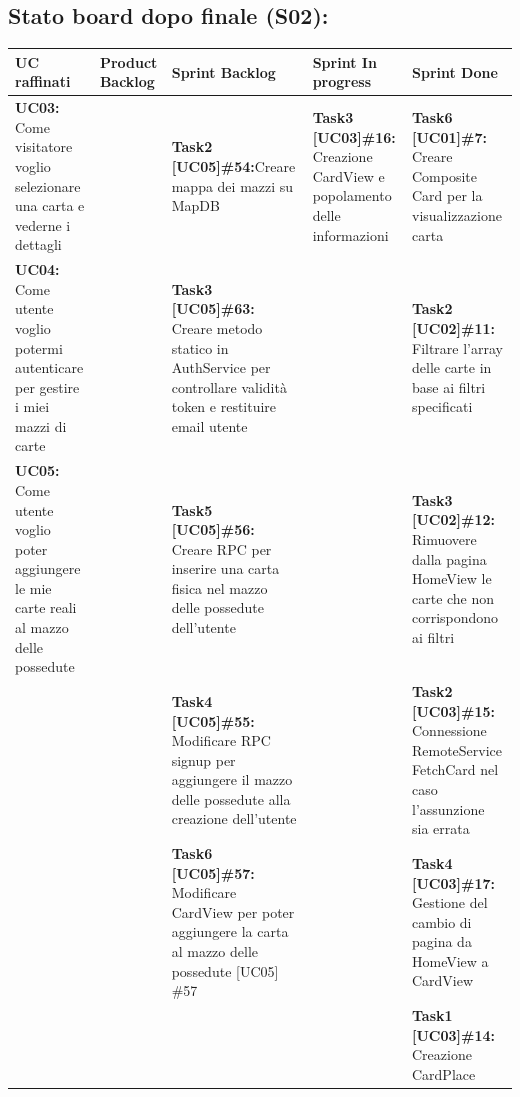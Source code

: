\begin{landscape}
        \subsection{Stato board dopo finale (S02):}
        \begin{itemize}
            \small
            \def\arraystretch{2}%
            \begin{tabular}{ | p{5cm} | p{3cm} | p{5cm} | p{5cm} | p{5cm}| }
                \hline
                \textbf{UC raffinati}
                & \textbf{Product Backlog}
                & \textbf{Sprint Backlog}
                & \textbf{Sprint In progress}
                & \textbf{Sprint Done} \\
                \hline
                \hline
                \textbf{UC03:}  Come visitatore voglio selezionare una carta e vederne i dettagli
                & & \textbf{Task2 [UC05]\#54:}Creare mappa dei mazzi su MapDB &   \textbf{Task3 [UC03]\#16:} Creazione CardView e popolamento delle informazioni  & \textbf{Task6 [UC01]\#7:}  Creare Composite Card per la visualizzazione carta \\
                \hline
                \textbf{UC04:}  Come utente voglio potermi autenticare per gestire i miei mazzi di carte
                & & \textbf{Task3 [UC05]\#63:} Creare metodo statico in AuthService per controllare validità token e restituire email utente  &   & \textbf{Task2 [UC02]\#11:} Filtrare l'array delle carte in base ai filtri specificati \\
                \hline
                \textbf{UC05:}  Come utente voglio poter aggiungere le mie carte reali al mazzo delle possedute & & \textbf{Task5 [UC05]\#56:} Creare RPC per inserire una carta fisica nel mazzo delle possedute dell'utente & & \textbf{Task3 [UC02]\#12:} Rimuovere dalla pagina HomeView le carte che non corrispondono ai filtri \\
                \hline
                &  & \textbf{Task4 [UC05]\#55:} Modificare RPC signup per aggiungere il mazzo delle possedute alla creazione dell'utente & & \textbf{Task2 [UC03]\#15:} Connessione RemoteService FetchCard nel caso l'assunzione sia errata \\
                \hline
                & & \textbf{Task6 [UC05]\#57:} Modificare CardView per poter aggiungere la carta al mazzo delle possedute [UC05] \#57   & & \textbf{Task4 [UC03]\#17:} Gestione del cambio di pagina da HomeView a CardView \\
                \hline
                & &  & & \textbf{Task1 [UC03]\#14:} Creazione CardPlace \\

\end{tabular}
\end{itemize}
\end{landscape}
